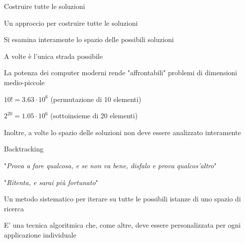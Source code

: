\begin{frame}{Costruire tutte le soluzioni}

\vspace{-9pt}
\begin{myboxtitle}
Un approccio per costruire tutte le soluzioni
\end{myboxtitle}



\BIL
\item Si esamina interamente lo spazio delle possibili soluzioni
\item A volte è l'unica strada possibile
\item La potenza dei computer moderni rende "affrontabili" problemi di dimensioni medio-piccole
\BI
\item $10!	= 3.63 \cdot 10^6$	(permutazione di 10 elementi)
\item $2^{20} = 1.05 \cdot 10^6$ (sottoinsieme di 20 elementi)
\EI
\item  Inoltre, a volte lo spazio delle soluzioni non deve essere analizzato 
interamente
\EIL
\end{frame}

\begin{frame}{Backtracking}

\vspace{-9pt}
\begin{myboxtitle}[Filosofia]
\BIL
\item  "\emph{Prova a fare qualcosa, e se non va bene, disfalo e prova qualcos'altro}"
\item "\emph{Ritenta, e sarai più fortunato}"
\EIL
\end{myboxtitle}

\begin{myboxtitle}
\BI
\item Un metodo sistematico per iterare su tutte le possibili istanze di uno spazio di ricerca
\item E' una tecnica algoritmica che, come altre, deve essere personalizzata per ogni applicazione individuale
\EI
\end{myboxtitle}

\end{frame}


